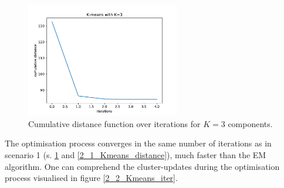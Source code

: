\documentclass{article}
\begin{document}
\begin{figure}[!ht]
\centering
\includegraphics[width=0.6\textwidth]{./Figures/2_2_Kmeans_distance_K3}
\caption{Cumulative distance function over iterations for $K=3$ components.}
\label{2_2_Kmeans_distance}
\end{figure}

The optimisation process converges in the same number of iterations as in scenario 1 (s. \ref{2_2_Kmeans_distance} and \ref{2_1_Kmeans_distance}), much faster than the EM algorithm. One can comprehend the cluster-updates during the optimisation process visualised in figure \ref{2_2_Kmeans_iter}.
\end{document}
